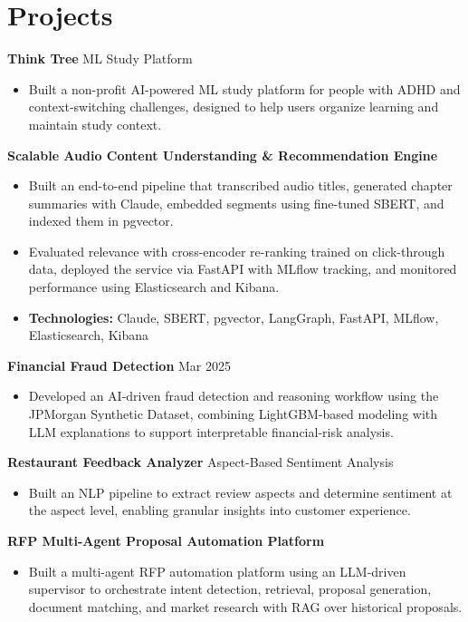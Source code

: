 \documentclass[10pt,a4paper]{article}
\begin{document}
\section{Projects}
\textbf{Think Tree} \textbar{} ML Study Platform\par
\begin{itemize}
  \item Built a non-profit AI-powered ML study platform for people with ADHD and context-switching challenges, designed to help users organize learning and maintain study context.
\end{itemize}
\textbf{Scalable Audio Content Understanding \& Recommendation Engine}\par
\begin{itemize}
  \item Built an end-to-end pipeline that transcribed audio titles, generated chapter summaries with Claude, embedded segments using fine-tuned SBERT, and indexed them in pgvector.
  \item Evaluated relevance with cross-encoder re-ranking trained on click-through data, deployed the service via FastAPI with MLflow tracking, and monitored performance using Elasticsearch and Kibana.
  \item \textbf{Technologies:} Claude, SBERT, pgvector, LangGraph, FastAPI, MLflow, Elasticsearch, Kibana
\end{itemize}
\textbf{Financial Fraud Detection} \textbar{} Mar 2025\par
\begin{itemize}
  \item Developed an AI-driven fraud detection and reasoning workflow using the JPMorgan Synthetic Dataset, combining LightGBM-based modeling with LLM explanations to support interpretable financial-risk analysis.
\end{itemize}
\textbf{Restaurant Feedback Analyzer} \textbar{} Aspect-Based Sentiment Analysis\par
\begin{itemize}
  \item Built an NLP pipeline to extract review aspects and determine sentiment at the aspect level, enabling granular insights into customer experience.
\end{itemize}
\textbf{RFP Multi-Agent Proposal Automation Platform}\par
\begin{itemize}
  \item Built a multi-agent RFP automation platform using an LLM-driven supervisor to orchestrate intent detection, retrieval, proposal generation, document matching, and market research with RAG over historical proposals.
\end{itemize}
\end{document}

